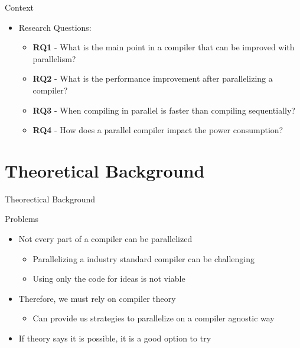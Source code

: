 
\begin{frame}{Context}
  \begin{itemize}
    \item Research Questions:
    \begin{itemize}
        \item \textbf{RQ1} - What is the main point in a compiler that can be improved with parallelism?
        \item \textbf{RQ2} - What is the performance improvement after parallelizing a compiler?
        \item \textbf{RQ3} - When compiling in parallel is faster than compiling sequentially?
        \item \textbf{RQ4} - How does a parallel compiler impact the power consumption?
    \end{itemize}
  \end{itemize}

\end{frame}

\section{Theoretical Background}
\begin{frame}{Theorectical Background}
  \begin{block}{Problems}
    \begin{itemize}
      \item Not every part of a compiler can be parallelized
      \begin{itemize}
        \item Parallelizing a industry standard compiler can be challenging
        \item Using only the code for ideas is not viable
      \end{itemize}
      \item Therefore, we must rely on compiler theory
      \begin{itemize}
          \item Can provide us strategies to parallelize on a compiler agnostic way
      \end{itemize}
      \item If theory says it is possible, it is a good option to try
    \end{itemize}
  \end{block}
\end{frame}
